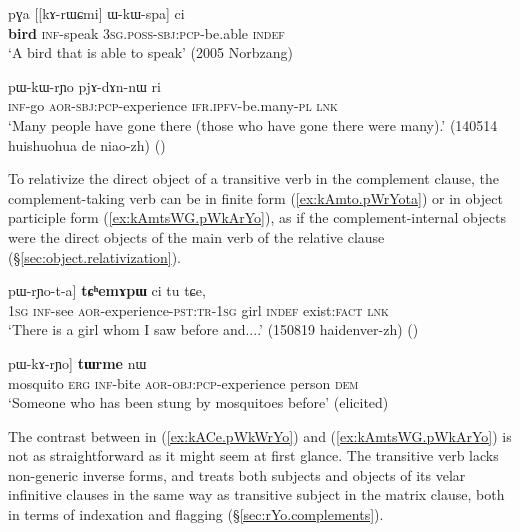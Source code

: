 \begin{exe}
\ex \label{ex:kArWCmi.kWspa}
\gll pɣa [[kɤ-rɯɕmi] ɯ-kɯ-spa] ci \\
\textbf{bird} \textsc{inf}-speak \textsc{3sg}.\textsc{poss}-\textsc{sbj}:\textsc{pcp}-be.able \textsc{indef} \\
\glt `A bird that is able to speak' (2005 Norbzang)
\end{exe}

\begin{exe}
\ex \label{ex:kACe.pWkWrYo}
\gll [kɤ-ɕe] pɯ-kɯ-rɲo pjɤ-dɤn-nɯ ri \\
\textsc{inf}-go \textsc{aor}-\textsc{sbj}:\textsc{pcp}-experience \textsc{ifr}.\textsc{ipfv}-be.many-\textsc{pl} \textsc{lnk} \\
\glt `Many people have gone there (those who have gone there were many).' (140514 huishuohua de niao-zh)
()
\end{exe}

To relativize the direct object of a transitive verb in the complement clause, the com\-ple\-ment-taking verb can be in finite form (\ref{ex:kAmto.pWrYota}) or in object participle form (\ref{ex:kAmtsWG.pWkArYo}), as if the complement-internal objects were the direct objects of the main verb of the relative clause (§\ref{sec:object.relativization}). 

\begin{exe}
\ex \label{ex:kAmto.pWrYota}
\gll [aʑo [kɤ-mto] pɯ-rɲo-t-a] \textbf{tɕʰemɤpɯ} ci tu tɕe, \\
\textsc{1sg} \textsc{inf}-see \textsc{aor}-experience-\textsc{pst}:\textsc{tr}-\textsc{1sg} girl \textsc{indef} exist:\textsc{fact} \textsc{lnk} \\
\glt `There is a girl whom I saw before and....' (150819 haidenver-zh)
()
\end{exe}

\begin{exe}
\ex \label{ex:kAmtsWG.pWkArYo}
\gll [[ʁmɤrɲɯɣ kɯ kɤ-mtsɯɣ] pɯ-kɤ-rɲo] \textbf{tɯrme} nɯ \\
mosquito \textsc{erg} \textsc{inf}-bite \textsc{aor}-\textsc{obj}:\textsc{pcp}-experience person \textsc{dem} \\
\glt `Someone who has been stung by mosquitoes before' (elicited)
\end{exe}

The contrast between  in (\ref{ex:kACe.pWkWrYo}) and   (\ref{ex:kAmtsWG.pWkArYo}) is not as straightforward as it might seem at first glance. The transitive verb  lacks non-generic inverse forms, and treats both subjects and objects of its velar infinitive clauses in the same way as transitive subject in the matrix clause, both in terms of indexation and flagging (§\ref{sec:rYo.complements}). 

